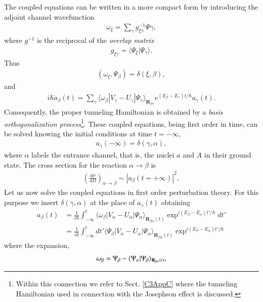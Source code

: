 The coupled equations can be written in a more compact form by introducing the adjoint channel wavefunction 
\begin{align}
\omega_\xi=\sum_{\gamma}g_{\xi\gamma}^{-1}\Psi{\gamma},
\end{align}
where $g^{-1}$ is the reciprocal of the \textit{overlap matrix}
\begin{align}
g_{\xi\gamma}=\langle\Psi_\xi|\Psi_\gamma\rangle.
\end{align}
Thus
\begin{align}
(\omega_\xi,\Psi_\beta)=\delta(\xi,\beta),
\end{align}
and
\begin{align}
i\hbar\dot a_\beta(t)=\sum_{\gamma}\langle\omega_\beta|V_\gamma-U_\gamma|\Psi_\gamma\rangle_{\mathbf R_{\beta\gamma}}e^{(E_\beta-E_\gamma)t/\hbar}a_\gamma(t).
\end{align}
Consequently, the proper tunneling Hamiltonian is obtained by a \textit{basis orthogonalization process}\footnote{Within this connection we refer to Sect. \ref{C3AppC} where the tunneling Hamiltonian used in connection with the Josephson effect is discussed.}. These coupled equations, being first order in time, can be solved knowing the initial conditions at time $t=-\infty$,
\begin{align}
a_\gamma(-\infty)=\delta(\gamma,\alpha),
\end{align}
where $\alpha$ labels the entrance channel, that is, the nuclei $a$ and $A$ in their ground state. The cross section for the reaction $\alpha\rightarrow\beta$ is
\begin{align}
\left(\frac{d\sigma}{d\Omega}\right)_{\alpha\rightarrow\beta}\sim\left|a_\beta(t=+\infty)\right|^2,
\end{align}
Let us now  solve the coupled equations in first order perturbation theory. For this purpose we insert $\delta(\gamma,\alpha)$ at the place of $a_\gamma(t)$ obtaining 
\begin{align}\label{eqintroB17}
\nonumber a_\beta(t)&=\frac{1}{i\hbar}\int_{-\infty}^{t}\langle\omega_\beta|V_\alpha-U_\alpha|\Psi_\alpha\rangle_{\mathbf R_{\beta\alpha}(t)}\exp^{i(E_\beta-E_\alpha)t'/\hbar}dt'\\
&=\frac{1}{i\hbar}\int_{-\infty}^{t}dt'\langle\Psi_\beta|V_\alpha-U_\alpha|\Psi_\alpha\rangle_{\mathbf R_{\beta\alpha}(t)}\exp^{i(E_\beta-E_\alpha)t'/\hbar}
\end{align}
where the expansion,
\begin{align}\label{eqintroB18}
\omega_\beta=\Psi_\beta-\langle {\Psi_\alpha|\Psi_\beta} \rangle_{\mathbf R_{\beta\alpha}(t)},
\end{align}
